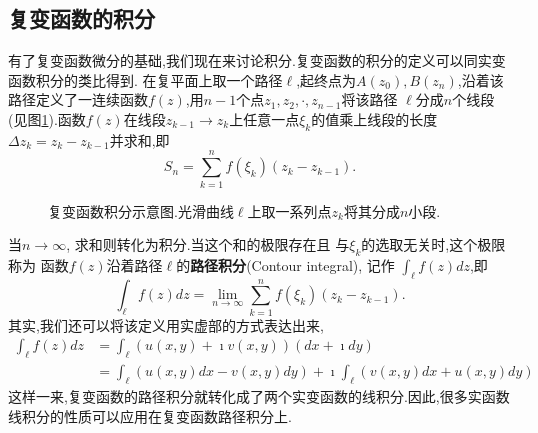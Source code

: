 \subsection[定义和性质]{复变函数的积分}
有了复变函数微分的基础,我们现在来讨论积分.复变函数的积分的定义可以同实变函数积分的类比得到.
在复平面上取一个路径$\ell$,起终点为$A(z_0),B(z_n)$,沿着该路径定义了一连续函数$f(z)$,用$n-1$个点$z_1, z_2,\cdot, z_{n-1}$将该路径
$\ell$分成$n$个线段(见图\ref{fig:complex_integral}).函数$f(z)$在线段$z_{k-1}\rightarrow z_{k}$上任意一点$\xi_k$的值乘上线段的长度$\Delta z_k = z_k - z_{k-1}$并求和,即
\begin{equation}
    S_n = \sum_{k=1}^{n} f(\xi_k) (z_{k} - z_{k-1}) .
\end{equation}
\begin{figure}[htbp]
    \centering
    
    \caption{复变函数积分示意图.光滑曲线$\ell$上取一系列点$z_k$将其分成$n$小段.}
    \label{fig:complex_integral}
\end{figure}
当$n\to \infty$, 求和则转化为积分.当这个和的极限存在且
与$\xi_k$的选取无关时,这个极限称为
函数$f(z)$沿着路径$\ell$的\textbf{路径积分}(Contour integral), 记作
$\int_{\ell} f(z) dz$,即
\begin{equation}
    \int_{\ell} f(z) dz = \lim_{n\to \infty} \sum_{k=1}^{n} f(\xi_k) (z_{k} - z_{k-1}) . 
\end{equation}
其实,我们还可以将该定义用实虚部的方式表达出来,
\begin{align}
    \int_{\ell} f(z) dz  & = \int_{\ell} \left( u(x,y) + \imath v(x,y) \right) (dx + \imath dy) 
    \\
    & = \int_{\ell} \left( u(x,y) dx  -  v(x,y) dy \right) + \imath \int_{\ell}  \left( v(x,y) dx  + u(x,y)dy \right) 
\end{align}
这样一来,复变函数的路径积分就转化成了两个实变函数的线积分.因此,很多实函数线积分的性质可以应用在复变函数路径积分上.



